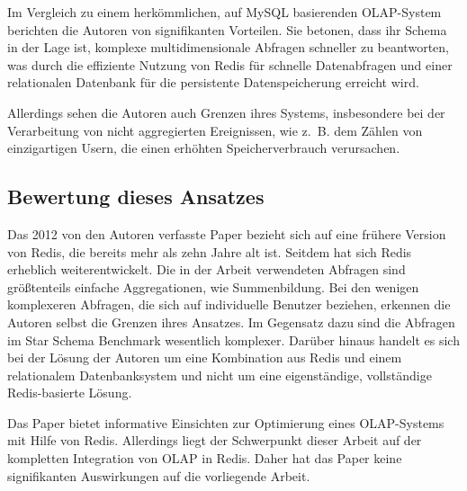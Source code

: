 Im Vergleich zu einem herkömmlichen, auf MySQL basierenden OLAP-System berichten die Autoren von signifikanten Vorteilen. Sie betonen, dass ihr Schema in der Lage ist, komplexe multidimensionale Abfragen schneller zu beantworten, was durch die effiziente Nutzung von Redis für schnelle Datenabfragen und einer relationalen Datenbank für die persistente Datenspeicherung erreicht wird.

Allerdings sehen die Autoren auch Grenzen ihres Systems, insbesondere bei der Verarbeitung von nicht aggregierten Ereignissen, wie z.~B. dem Zählen von einzigartigen Usern, die einen erhöhten Speicherverbrauch verursachen.


\subsection{Bewertung dieses Ansatzes}
Das 2012 von den Autoren verfasste Paper bezieht sich auf eine frühere Version von Redis, die bereits mehr als zehn Jahre alt ist.
Seitdem hat sich Redis erheblich weiterentwickelt.
Die in der Arbeit verwendeten Abfragen sind größtenteils einfache Aggregationen, wie Summenbildung.
Bei den wenigen komplexeren Abfragen, die sich auf individuelle Benutzer beziehen, erkennen die Autoren selbst die Grenzen ihres Ansatzes.
Im Gegensatz dazu sind die Abfragen im Star Schema Benchmark wesentlich komplexer.
Darüber hinaus handelt es sich bei der Lösung der Autoren um eine Kombination aus Redis und einem relationalem Datenbanksystem und nicht um eine eigenständige, vollständige Redis-basierte Lösung.

Das Paper bietet informative Einsichten zur Optimierung eines OLAP-Systems mit Hilfe von Redis. Allerdings liegt der Schwerpunkt dieser Arbeit auf der kompletten Integration von OLAP in Redis. Daher hat das Paper keine signifikanten Auswirkungen auf die vorliegende Arbeit.
